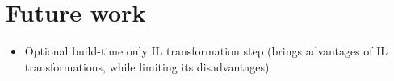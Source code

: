 \chapter{Future work}

\begin{itemize}
\item Optional build-time only IL transformation step (brings advantages of IL transformations, while limiting its disadvantages)
\end{itemize}
